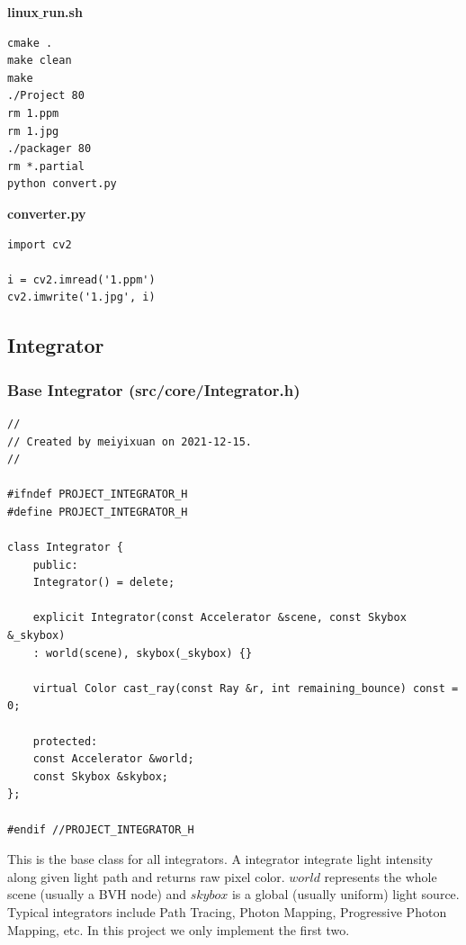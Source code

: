 \documentclass[utf8]{article}
\begin{document}
\noindent
\textbf{linux$\_$run.sh}
\begin{lstlisting}[style=CStyle]
cmake .
make clean
make
./Project 80
rm 1.ppm
rm 1.jpg
./packager 80
rm *.partial
python convert.py
\end{lstlisting}

\noindent
\textbf{converter.py}
\begin{lstlisting}[style=CStyle]
import cv2

i = cv2.imread('1.ppm')
cv2.imwrite('1.jpg', i)

\end{lstlisting}

\subsection{Integrator}
\subsubsection{Base Integrator (src/core/Integrator.h)}
\begin{lstlisting}[style=CStyle]
//
// Created by meiyixuan on 2021-12-15.
//

#ifndef PROJECT_INTEGRATOR_H
#define PROJECT_INTEGRATOR_H

class Integrator {
	public:
	Integrator() = delete;
	
	explicit Integrator(const Accelerator &scene, const Skybox &_skybox)
	: world(scene), skybox(_skybox) {}
	
	virtual Color cast_ray(const Ray &r, int remaining_bounce) const = 0;
	
	protected:
	const Accelerator &world;
	const Skybox &skybox;
};

#endif //PROJECT_INTEGRATOR_H

\end{lstlisting}
This is the base class for all integrators. A integrator integrate light intensity along given light path and returns raw pixel color. $world$ represents the whole scene (usually a BVH node) and $skybox$ is a global (usually uniform) light source. Typical integrators include Path Tracing, Photon Mapping, Progressive Photon Mapping, etc. In this project we only implement the first two.
\end{document}
